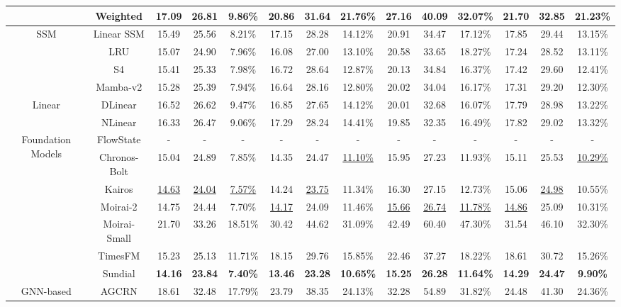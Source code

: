\begin{table}[t]
{\begin{tabular}{c|c|c|c|c|c|c|c|c|c|c|c|c|c}
 & Weighted & 17.09 & 26.81 & 9.86\% & 20.86 & 31.64 & 21.76\% & 27.16 & 40.09 & 32.07\% & 21.70 & 32.85 & 21.23\% \\
\midrule
\multirow{4}{*}{SSM} & Linear SSM & 15.49 & 25.56 & 8.21\% & 17.15 & 28.28 & 14.12\% & 20.91 & 34.47 & 17.12\% & 17.85 & 29.44 & 13.15\% \\
 & LRU & 15.07 & 24.90 & 7.96\% & 16.08 & 27.00 & 13.10\% & 20.58 & 33.65 & 18.27\% & 17.24 & 28.52 & 13.11\% \\
 & S4 & 15.41 & 25.33 & 7.98\% & 16.72 & 28.64 & 12.87\% & 20.13 & 34.84 & 16.37\% & 17.42 & 29.60 & 12.41\% \\
 & Mamba-v2 & 15.28 & 25.39 & 7.94\% & 16.64 & 28.16 & 12.80\% & 20.02 & 34.04 & 16.17\% & 17.31 & 29.20 & 12.30\% \\
\midrule
\multirow{2}{*}{Linear} & DLinear & 16.52 & 26.62 & 9.47\% & 16.85 & 27.65 & 14.12\% & 20.01 & 32.68 & 16.07\% & 17.79 & 28.98 & 13.22\% \\
 & NLinear & 16.33 & 26.47 & 9.06\% & 17.29 & 28.24 & 14.41\% & 19.85 & 32.35 & 16.49\% & 17.82 & 29.02 & 13.32\% \\
\midrule
\multirow{7}{*}{Foundation Models} & FlowState & - & - & - & - & - & - & - & - & - & - & - & - \\
 & Chronos-Bolt & 15.04 & 24.89 & 7.85\% & 14.35 & 24.47 & \underline{11.10\%} & 15.95 & 27.23 & 11.93\% & 15.11 & 25.53 & \underline{10.29\%} \\
 & Kairos & \underline{14.63} & \underline{24.04} & \underline{7.57\%} & 14.24 & \underline{23.75} & 11.34\% & 16.30 & 27.15 & 12.73\% & 15.06 & \underline{24.98} & 10.55\% \\
 & Moirai-2 & 14.75 & 24.44 & 7.70\% & \underline{14.17} & 24.09 & 11.46\% & \underline{15.66} & \underline{26.74} & \underline{11.78\%} & \underline{14.86} & 25.09 & 10.31\% \\
 & Moirai-Small & 21.70 & 33.26 & 18.51\% & 30.42 & 44.62 & 31.09\% & 42.49 & 60.40 & 47.30\% & 31.54 & 46.10 & 32.30\% \\
 & TimesFM & 15.23 & 25.13 & 11.71\% & 18.15 & 29.76 & 15.85\% & 22.46 & 37.27 & 18.22\% & 18.61 & 30.72 & 15.26\% \\
 & Sundial & \textbf{14.16} & \textbf{23.84} & \textbf{7.40\%} & \textbf{13.46} & \textbf{23.28} & \textbf{10.65\%} & \textbf{15.25} & \textbf{26.28} & \textbf{11.64\%} & \textbf{14.29} & \textbf{24.47} & \textbf{9.90\%} \\
\midrule
\multirow{10}{*}{GNN-based} & AGCRN & 18.61 & 32.48 & 17.79\% & 23.79 & 38.35 & 24.13\% & 32.28 & 54.89 & 31.82\% & 24.48 & 41.30 & 24.36\% \\

\end{tabular}}
\end{table}
